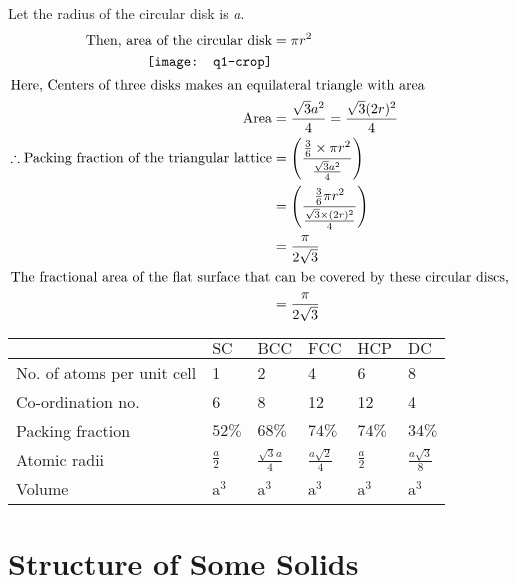 \begin{answer}
	Let the radius of the circular disk is \textit{a}.\\
	\begin{align*}
	\text{Then, area of the circular disk}&= \pi r^{2}\\
	\texttt{[image: q1-crop]}\\
	\intertext{Here, Centers of three disks makes an equilateral triangle with area}\text{Area}&= \frac{\sqrt{3}a^{2}}{4} = \frac{\sqrt{3}(2r)^{2}}{4}\\
	\therefore \text{Packing fraction of the triangular lattice}&= \left( \frac{\frac{3}{6} \times \pi r^{2}}{\frac{\sqrt{3}a^{2}}{4}}\right) \\
	&= \left( \frac{\frac{3}{6} \pi r^{2}}{\frac{\sqrt{3}\times (2r)^{2}}{4}}\right) \\
	&=\frac{\pi}{2 \sqrt{3}}\\
	 \intertext{The fractional area of the flat surface that can be covered by these circular discs,}&=\frac{\pi}{2 \sqrt{3}}
	\end{align*}
\end{answer}
\setlength\arrayrulewidth{1pt}
\begin{table}[H]
	\centering
	\renewcommand{\arraystretch}{1.5}
	\begin{tabular}{|l|l|l|l|l|l|}
		\hline & $\mathrm{SC}$ & $\mathrm{BCC}$ & $\mathrm{FCC}$ & $\mathrm{HCP}$ & $\mathrm{DC}$ \\
		\hline No. of atoms per unit cell & 1 & 2 & 4 & 6 & 8 \\
		\hline Co-ordination no. & 6 & 8 & 12 & 12 & 4 \\
		\hline Packing fraction & $52 \%$ & $68 \%$ & $74 \%$ & $74 \%$ & $34 \%$ \\
		\hline Atomic radii & $\frac{a}{2}$ & $\frac{\sqrt{3} a}{4}$ & $\frac{a \sqrt{2}}{4}$ & $\frac{a}{2}$ & $\frac{a \sqrt{3}}{8}$ \\
		\hline Volume & $\mathrm{a}^{3}$ & $\mathrm{a}^{3}$ & $\mathrm{a}^{3}$ & $\mathrm{a}^{3}$ & $\mathrm{a}^{3}$ \\
		\hline
	\end{tabular}
\end{table}
\section{Structure of Some Solids}
